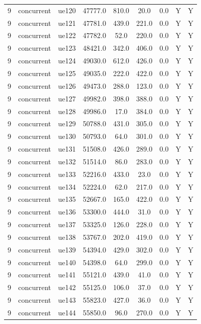 \begin{table}[ht]
\begin{tabular}{|c|c|c|c|c|c|c|c|c|}
9 & concurrent & ue120 & 47777.0 & 810.0 & 20.0 & 0.0 & Y & Y \\
9 & concurrent & ue121 & 47781.0 & 439.0 & 221.0 & 0.0 & Y & Y \\
9 & concurrent & ue122 & 47782.0 & 52.0 & 220.0 & 0.0 & Y & Y \\
9 & concurrent & ue123 & 48421.0 & 342.0 & 406.0 & 0.0 & Y & Y \\
9 & concurrent & ue124 & 49030.0 & 612.0 & 426.0 & 0.0 & Y & Y \\
9 & concurrent & ue125 & 49035.0 & 222.0 & 422.0 & 0.0 & Y & Y \\
9 & concurrent & ue126 & 49473.0 & 288.0 & 123.0 & 0.0 & Y & Y \\
9 & concurrent & ue127 & 49982.0 & 398.0 & 388.0 & 0.0 & Y & Y \\
9 & concurrent & ue128 & 49986.0 & 17.0 & 384.0 & 0.0 & Y & Y \\
9 & concurrent & ue129 & 50788.0 & 431.0 & 305.0 & 0.0 & Y & Y \\
9 & concurrent & ue130 & 50793.0 & 64.0 & 301.0 & 0.0 & Y & Y \\
9 & concurrent & ue131 & 51508.0 & 426.0 & 289.0 & 0.0 & Y & Y \\
9 & concurrent & ue132 & 51514.0 & 86.0 & 283.0 & 0.0 & Y & Y \\
9 & concurrent & ue133 & 52216.0 & 433.0 & 23.0 & 0.0 & Y & Y \\
9 & concurrent & ue134 & 52224.0 & 62.0 & 217.0 & 0.0 & Y & Y \\
9 & concurrent & ue135 & 52667.0 & 165.0 & 422.0 & 0.0 & Y & Y \\
9 & concurrent & ue136 & 53300.0 & 444.0 & 31.0 & 0.0 & Y & Y \\
9 & concurrent & ue137 & 53325.0 & 126.0 & 228.0 & 0.0 & Y & Y \\
9 & concurrent & ue138 & 53767.0 & 202.0 & 419.0 & 0.0 & Y & Y \\
9 & concurrent & ue139 & 54394.0 & 429.0 & 302.0 & 0.0 & Y & Y \\
9 & concurrent & ue140 & 54398.0 & 64.0 & 299.0 & 0.0 & Y & Y \\
9 & concurrent & ue141 & 55121.0 & 439.0 & 41.0 & 0.0 & Y & Y \\
9 & concurrent & ue142 & 55125.0 & 106.0 & 37.0 & 0.0 & Y & Y \\
9 & concurrent & ue143 & 55823.0 & 427.0 & 36.0 & 0.0 & Y & Y \\
9 & concurrent & ue144 & 55850.0 & 96.0 & 270.0 & 0.0 & Y & Y \\

\end{tabular}
\end{table}
